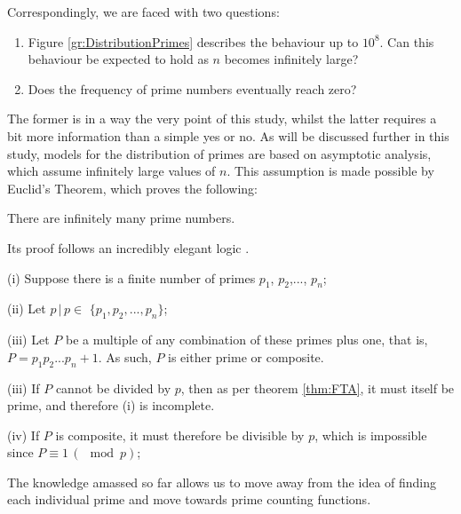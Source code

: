 Correspondingly, we are faced with two questions:
\begin{enumerate}
	\item Figure \ref{gr:DistributionPrimes} describes the behaviour up to $10^8$. Can this behaviour be expected to hold as $n$ becomes infinitely large?
	\item Does the frequency of prime numbers eventually reach zero?
\end{enumerate}

The former is in a way the very point of this study, whilst the latter requires a bit more information than a simple yes or no. As will be discussed further in this study, models for the distribution of primes are based on asymptotic analysis, which assume infinitely large values of $n$. This assumption is made possible by Euclid's Theorem, which proves the following:
\begin{Thm} \label{thm:EuclidsTheorem}
	There are infinitely many prime numbers.
\end{Thm}
Its proof follows an incredibly elegant logic \citep[pp. 147, 148]{ClawsonMathMysteries}.
\begin{Pro}
	(i) Suppose there is a finite number of primes $p_1$, $p_2$,$...$, $p_n$; \par
	(ii) Let $p\, |\, p \in$ $\{p_1, p_2, ..., p_n\}$; \par
	(iii) Let $P$ be a multiple of any combination of these primes plus one, that is, $P = p_1 p_2 ... p_n +1$. As such, $P$ is either prime or composite. \par
	(iii) If $P$ cannot be divided by $p$, then as per theorem \ref{thm:FTA}, it must itself be prime, and therefore (i) is incomplete.\par
	(iv) If $P$ is composite, it must therefore be divisible by $p$, which is impossible since $P \equiv 1 \, (\mod p)$; \par
\end{Pro}

The knowledge amassed so far allows us to move away from the idea of finding each individual prime and move towards prime counting functions.